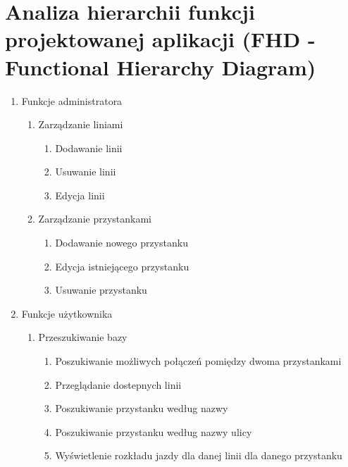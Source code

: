 \section{Analiza hierarchii funkcji projektowanej aplikacji (FHD - Functional Hierarchy
Diagram)}
\renewcommand{\labelenumii}{\arabic{enumi}.\arabic{enumii}.}
\renewcommand{\labelenumiii}{\arabic{enumi}.\arabic{enumii}.\arabic{enumiii}.}

\begin{enumerate}
    \item Funkcje administratora
    \begin{enumerate}
        \item Zarządzanie liniami
                \begin{enumerate}
                    \item Dodawanie linii
                    \item Usuwanie linii
                    \item Edycja linii
                \end{enumerate}
        \item Zarządzanie przystankami
                \begin{enumerate}
                    \item Dodawanie nowego przystanku
                    \item Edycja istniejącego przystanku
                    \item Usuwanie przystanku
                \end{enumerate}
    \end{enumerate}

    \item Funkcje użytkownika
     \begin{enumerate}
        \item Przeszukiwanie bazy
            \begin{enumerate}
                \item Poszukiwanie możliwych połączeń pomiędzy dwoma przystankami
                \item Przeglądanie dostepnych linii
                \item Poszukiwanie przystanku według nazwy
                \item Poszukiwanie przystanku według nazwy ulicy
                \item Wyświetlenie rozkładu jazdy dla danej linii dla danego przystanku
            \end{enumerate}

     \end{enumerate}

\end{enumerate}




